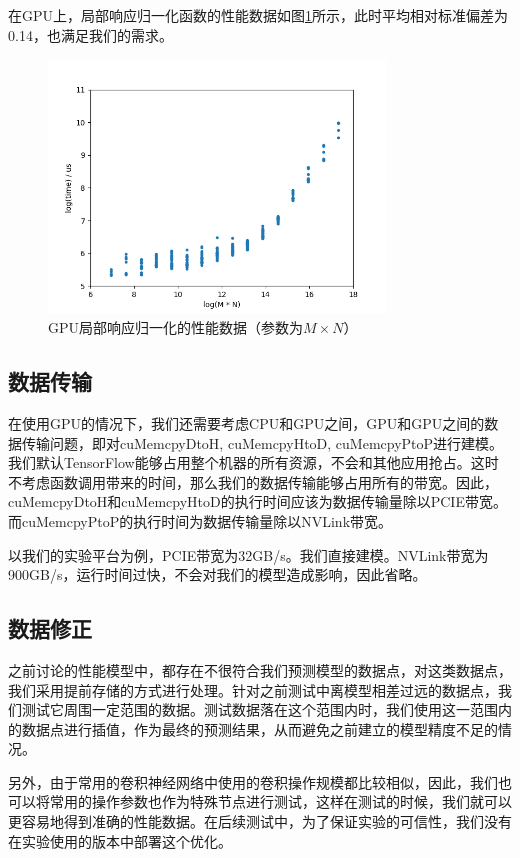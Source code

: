     在GPU上，局部响应归一化函数的性能数据如图\ref{fig:lrn_gpu}所示，此时平均相对标准偏差为0.14，也满足我们的需求。

    \begin{figure}[!htbp]
        \centering
        \includegraphics[width=0.8\textwidth]{figures/lrn_gpu.png}
        \caption{GPU局部响应归一化的性能数据（参数为$ M \times N $）}
        \label{fig:lrn_gpu}
    \end{figure}

\subsection{数据传输}
    在使用GPU的情况下，我们还需要考虑CPU和GPU之间，GPU和GPU之间的数据传输问题，即对cuMemcpyDtoH, cuMemcpyHtoD, cuMemcpyPtoP进行建模。
    我们默认TensorFlow能够占用整个机器的所有资源，不会和其他应用抢占。这时不考虑函数调用带来的时间，那么我们的数据传输能够占用所有的带宽。因此，cuMemcpyDtoH和cuMemcpyHtoD的执行时间应该为数据传输量除以PCIE带宽。而cuMemcpyPtoP的执行时间为数据传输量除以NVLink带宽。

    以我们的实验平台为例，PCIE带宽为32GB/s。我们直接建模。NVLink带宽为900GB/s，运行时间过快，不会对我们的模型造成影响，因此省略。

\subsection{数据修正}
    之前讨论的性能模型中，都存在不很符合我们预测模型的数据点，对这类数据点，我们采用提前存储的方式进行处理。针对之前测试中离模型相差过远的数据点，我们测试它周围一定范围的数据。测试数据落在这个范围内时，我们使用这一范围内的数据点进行插值，作为最终的预测结果，从而避免之前建立的模型精度不足的情况。
    
    另外，由于常用的卷积神经网络中使用的卷积操作规模都比较相似，因此，我们也可以将常用的操作参数也作为特殊节点进行测试，这样在测试的时候，我们就可以更容易地得到准确的性能数据。在后续测试中，为了保证实验的可信性，我们没有在实验使用的版本中部署这个优化。

